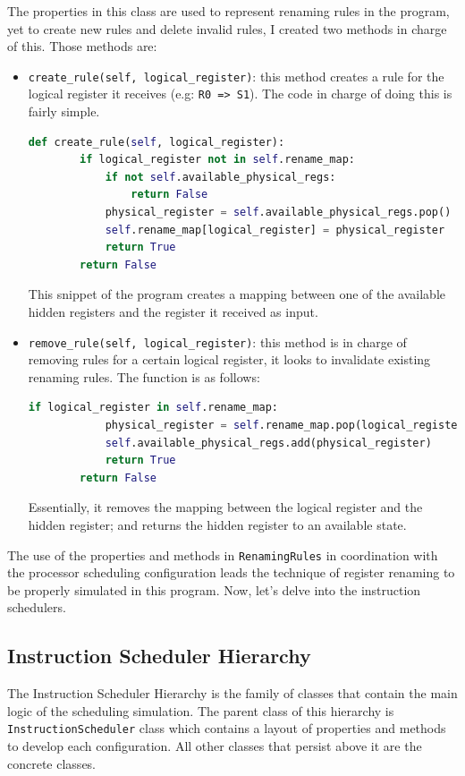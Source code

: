 \documentclass{article}
\begin{document}
The properties in this class are used to represent renaming rules in the program, yet to create new rules and delete invalid rules, I created two methods in charge of this. Those methods are:

\begin{itemize}
    \item \lstinline|create_rule(self, logical_register)|: this method creates a rule for the logical register it receives (e.g: \lstinline|R0 => S1|). The code in charge of doing this is fairly simple. 
\begin{lstlisting}[language=Python]
    def create_rule(self, logical_register):
        if logical_register not in self.rename_map:
            if not self.available_physical_regs:
                return False 
            physical_register = self.available_physical_regs.pop() 
            self.rename_map[logical_register] = physical_register
            return True
        return False
\end{lstlisting}
    This snippet of the program creates a mapping between one of the available hidden registers and the register it received as input. 
    \item \lstinline|remove_rule(self, logical_register)|: this method is in charge of removing rules for a certain logical register, it looks to invalidate existing renaming rules. The function is as follows:
\begin{lstlisting}[language=Python]
        if logical_register in self.rename_map:
            physical_register = self.rename_map.pop(logical_register)
            self.available_physical_regs.add(physical_register) 
            return True
        return False
\end{lstlisting}
    Essentially, it removes the mapping between the logical register and the hidden register; and returns the hidden register to an available state. 
\end{itemize}

The use of the properties and methods in \lstinline|RenamingRules| in coordination with the processor scheduling configuration leads the technique of register renaming to be properly simulated in this program. Now, let's delve into the instruction schedulers.

\subsection{Instruction Scheduler Hierarchy}
The Instruction Scheduler Hierarchy is the family of classes that contain the main logic of the scheduling simulation. The parent class of this hierarchy is \lstinline|InstructionScheduler| class which contains a layout of properties and methods to develop each configuration. All other classes that persist above it are the concrete classes.
\end{document}

